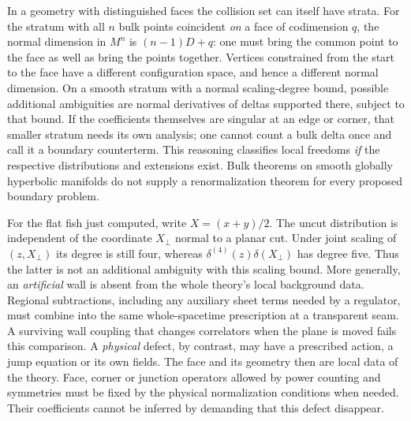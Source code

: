 In a geometry with distinguished faces the collision set can itself have
strata. For the stratum with all $n$ bulk points coincident \emph{on} a
face of codimension $q$, the normal dimension in $M^n$ is
$(n-1)D+q$: one must bring the common point to the face as well as bring
the points together. Vertices constrained from the start to the face have
a different configuration space, and hence a different normal dimension.
On a smooth stratum with a normal scaling-degree bound, possible additional
ambiguities are normal derivatives of deltas supported there, subject to
that bound. If the coefficients themselves are singular at an edge or
corner, that smaller stratum needs its own analysis; one cannot count a
bulk delta once and call it a boundary counterterm. This reasoning
classifies local freedoms \emph{if} the respective distributions and
extensions exist. Bulk theorems on smooth globally hyperbolic manifolds do
not supply a renormalization theorem for every proposed boundary problem.

For the flat fish just computed, write $X=(x+y)/2$. The uncut distribution
is independent of the coordinate $X_\perp$ normal to a planar cut.
Under joint scaling of $(z,X_\perp)$ its degree is still four, whereas
$\delta^{(4)}(z)\delta(X_\perp)$ has degree five. Thus the latter is not
an additional ambiguity with this scaling bound. More generally, an
\emph{artificial} wall is absent from the whole theory's local background
data. Regional subtractions, including any auxiliary sheet terms needed by
a regulator, must combine into the same whole-spacetime prescription at a
transparent seam. A surviving wall coupling that changes correlators when
the plane is moved fails this comparison. A \emph{physical} defect, by
contrast, may have a prescribed action, a jump equation or its own fields.
The face and its geometry then are local data of the theory. Face, corner
or junction operators allowed by power counting and symmetries must be
fixed by the physical normalization conditions when needed. Their
coefficients cannot be inferred by demanding that this defect disappear.

